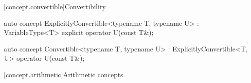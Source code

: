 \documentclass[american,twoside]{book}
\begin{document}
\begin{itemdescr}
\pnum
{}
\end{itemdescr}

[concept.convertible]{Convertibility}

\begin{itemdecl}
auto concept ExplicitlyConvertible<typename T, typename U> : VariableType<T> {
  explicit operator U(const T&);
}
\end{itemdecl}

\begin{itemdescr}
\pnum
{}
\end{itemdescr}

\begin{itemdecl}
auto concept Convertible<typename T, typename U> : ExplicitlyConvertible<T, U> {
  operator U(const T&);
}
\end{itemdecl}

\begin{itemdescr}
\pnum
{}
\end{itemdescr}

[concept.arithmetic]{Arithmetic concepts}
\end{document}
